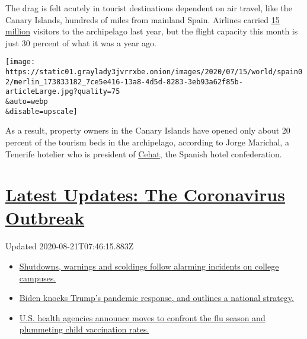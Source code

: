 The drag is felt acutely in tourist destinations dependent on air
travel, like the Canary Islands, hundreds of miles from mainland Spain.
Airlines carried
\href{https://www.canarias7.es/economia/canarias-mantuvo-el-liston-de-los-15-millones-de-turistas-en-2019-GN8609091\#:~:text=Canarias\%20cerr\%C3\%B3\%20el\%20a\%C3\%B1o\%202019,Nacional\%20de\%20Estad\%C3\%ADstica\%20(INE).}{15
million} visitors to the archipelago last year, but the flight capacity
this month is just 30 percent of what it was a year ago.

\texttt{[image: https://static01.graylady3jvrrxbe.onion/images/2020/07/15/world/spain02/merlin\_173833182\_7ce5e416-13a8-4d5d-8283-3eb93a62f85b-articleLarge.jpg?quality=75\\\&auto=webp\\\&disable=upscale]}

As a result, property owners in the Canary Islands have opened only
about 20 percent of the tourism beds in the archipelago, according to
Jorge Marichal, a Tenerife hotelier who is president of
\href{https://cehat.com/frontend/cehat/base.php}{Cehat}, the Spanish
hotel confederation.

\hypertarget{latest-updates-the-coronavirus-outbreak}{%
\section{\texorpdfstring{\href{https://www.nytimes3xbfgragh.onion/2020/08/20/world/coronavirus-covid.html?action=click\&pgtype=Article\&state=default\&region=MAIN_CONTENT_1\&context=storylines_live_updates}{Latest
Updates: The Coronavirus
Outbreak}}{Latest Updates: The Coronavirus Outbreak}}\label{latest-updates-the-coronavirus-outbreak}}

Updated 2020-08-21T07:46:15.883Z

\begin{itemize}
\tightlist
\item
  \href{https://www.nytimes3xbfgragh.onion/2020/08/20/world/coronavirus-covid.html?action=click\&pgtype=Article\&state=default\&region=MAIN_CONTENT_1\&context=storylines_live_updates\#link-68774d88}{Shutdowns,
  warnings and scoldings follow alarming incidents on college campuses.}
\item
  \href{https://www.nytimes3xbfgragh.onion/2020/08/20/world/coronavirus-covid.html?action=click\&pgtype=Article\&state=default\&region=MAIN_CONTENT_1\&context=storylines_live_updates\#link-26b58724}{Biden
  knocks Trump's pandemic response, and outlines a national strategy.}
\item
  \href{https://www.nytimes3xbfgragh.onion/2020/08/20/world/coronavirus-covid.html?action=click\&pgtype=Article\&state=default\&region=MAIN_CONTENT_1\&context=storylines_live_updates\#link-4e542da3}{U.S.
  health agencies announce moves to confront the flu season and
  plummeting child vaccination rates.}
\end{itemize}

